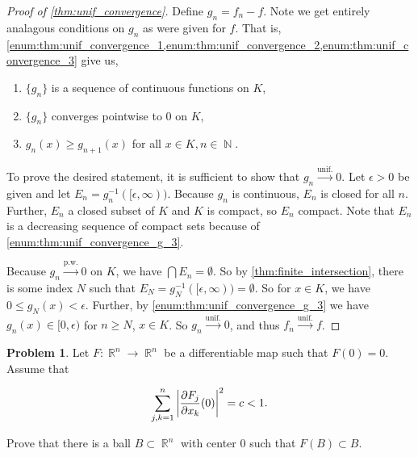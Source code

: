 \documentclass[english]{article}
\DeclareMathOperator{\R}{\mathbb{R}}
\DeclareMathOperator{\N}{\mathbb{N}}
\DeclareMathOperator{\<}{\langle}
\renewcommand{\>}{\rangle}
\newcommand{\inv}[1]{#1^{-1}}
\theoremstyle{definition}
\newtheorem{problem}[theorem]{Problem}
\begin{document}
\begin{proof}[Proof of \cref{thm:unif_convergence}]
    Define $g_n = f_n - f$. Note we get entirely analagous conditions on $g_n$ as were given for $f$. That is, \cref{enum:thm:unif_convergence_1,enum:thm:unif_convergence_2,enum:thm:unif_convergence_3} give us,

    \begin{enumerate}
        \item \label{enum:thm:unif_convergence_g_1} $\{g_n\}$ is a sequence of continuous functions on $K$,
        \item \label{enum:thm:unif_convergence_g_2} $\{g_n\}$ converges pointwise to 0 on $K$,
        \item \label{enum:thm:unif_convergence_g_3} $g_n(x) \geq g_{n + 1}(x)$ for all $x \in K, n \in \N$.
    \end{enumerate}
    
    To prove the desired statement, it is sufficient to show that $g_n \overset{\text{unif.}}{\to} 0$. Let $\epsilon > 0$ be given and let $E_n = \inv{g_n}([\epsilon, \infty))$. Because $g_n$ is continuous, $E_n$ is closed for all $n$. Further, $E_n$ a closed subset of  $K$ and $K$ is compact, so $E_n$ compact. Note that $E_n$ is a decreasing sequence of compact sets because of \cref{enum:thm:unif_convergence_g_3}.

    Because $g_n \overset{\text{p.w.}}{\to} 0$ on $K$, we have $\bigcap E_n = \emptyset$. So by \cref{thm:finite_intersection}, there is some index $N$ such that $E_N = \inv{g_N}([\epsilon, \infty)) = \emptyset$. So for $x \in K$, we have $0 \leq g_N(x) < \epsilon$. Further, by \cref{enum:thm:unif_convergence_g_3} we have $g_n(x) \in [0, \epsilon)$ for $n \geq N$, $x \in K$. So $g_n \overset{\text{unif.}}{\to} 0$, and thus $f_n \overset{\text{unif.}}{\to} f$.
\end{proof}

\begin{problem}
    \label{prob:ball_at_origin}
    Let $F: \R^n \to \R^n$ be a differentiable map such that $F(0) = 0$. Assume that 

    \[
      \sum_{j, k = 1}^n \left| {\partial F_j \over \partial x_k} (0) \right|^2 = c < 1.
    \]

    Prove that there is a ball $B \subset \R^n$ with center 0 such that $F(B) \subset B$.
\end{problem}
\end{document}
